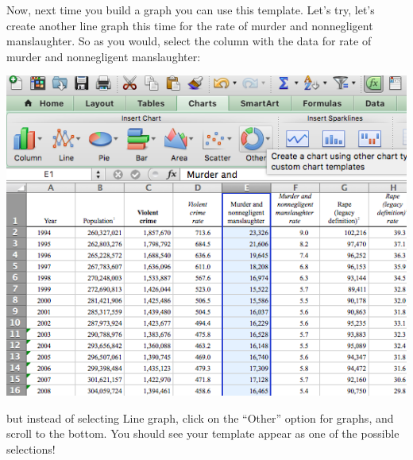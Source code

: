 \documentclass[
]{book}
\begin{document}
Now, next time you build a graph you can use this template. Let's try, let's create another line graph this time for the rate of murder and nonnegligent manslaughter. So as you would, select the column with the data for rate of murder and nonnegligent manslaughter:

\includegraphics{imgs/select_mm_col.png}

but instead of selecting Line graph, click on the ``Other'' option for graphs, and scroll to the bottom. You should see your template appear as one of the possible selections!
\end{document}
